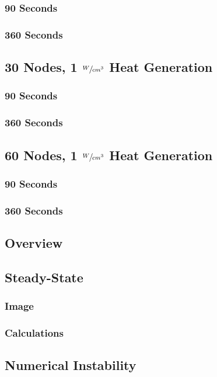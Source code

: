 \documentclass[12pt,letterpaper]{report}
\begin{document}
	\subsubsection{90 Seconds}
	\subsubsection{360 Seconds}	
	
	\subsection{30 Nodes, 1 $\sfrac{W}{cm^3}$ Heat Generation}
	\subsubsection{90 Seconds}
	\subsubsection{360 Seconds}
	
	\subsection{60 Nodes, 1 $\sfrac{W}{cm^3}$ Heat Generation}
	\subsubsection{90 Seconds}
	\subsubsection{360 Seconds}
	
	\subsection{Overview}
	
	\subsection{Steady-State}
	\subsubsection{Image}
	\subsubsection{Calculations}
	
	\subsection{Numerical Instability}
	
\end{document}
